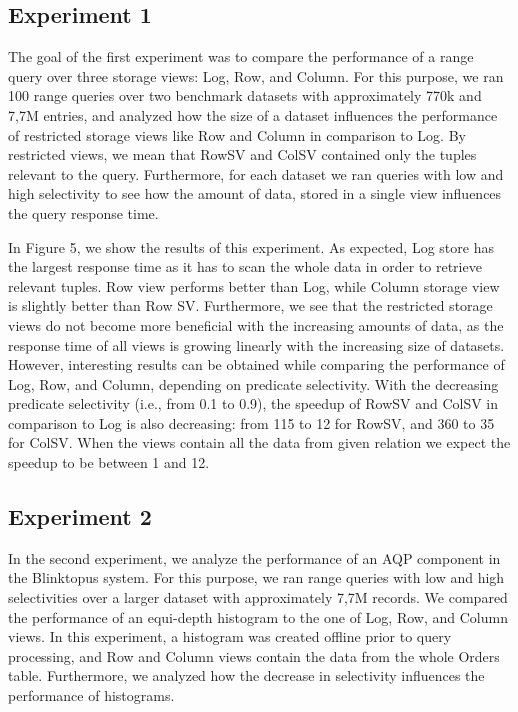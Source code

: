 \documentclass[10pt, conference, compsocconf]{IEEEtran}
\begin{document}
\subsection{Experiment 1}
The goal of the first experiment was to compare the performance of a range query over three storage views: Log, Row, and Column. For this purpose, we ran 100 range queries over two benchmark datasets with approximately 770k and 7,7M entries, and analyzed how the size of a dataset influences the performance of restricted storage views like Row and Column in comparison to Log. By restricted views, we mean that RowSV and ColSV contained only the tuples relevant to the query. Furthermore, for each dataset we ran queries with low and high selectivity to see how the amount of data, stored in a single view influences the query response time.

In Figure 5, we show the results of this experiment. As expected, Log store has the largest response time as it has to scan the whole data in order to retrieve relevant tuples. Row view performs better than Log, while Column storage view is slightly better than Row SV. Furthermore, we see that the restricted storage views do not become more beneficial with the increasing amounts of data, as the response time of all views is growing linearly with the increasing size of datasets. However, interesting results can be obtained while comparing the performance of Log, Row, and Column, depending on predicate selectivity. With the decreasing predicate selectivity (i.e., from 0.1 to 0.9), the speedup of RowSV and ColSV in comparison to Log is also decreasing: from 115 to 12 for RowSV, and 360 to 35 for ColSV. When the views contain all the data from given relation we expect the speedup to be between 1 and 12.

\subsection{Experiment 2}
In the second experiment, we analyze the performance of an AQP component in the Blinktopus system. For this purpose, we ran range queries with low and high selectivities over a larger dataset with approximately 7,7M records. We compared the performance of an equi-depth histogram to the one of Log, Row, and Column views. In this experiment, a histogram was created offline prior to query processing, and Row and Column views contain the data from the whole Orders table. Furthermore, we analyzed how the decrease in selectivity influences the performance of histograms.
\end{document}
